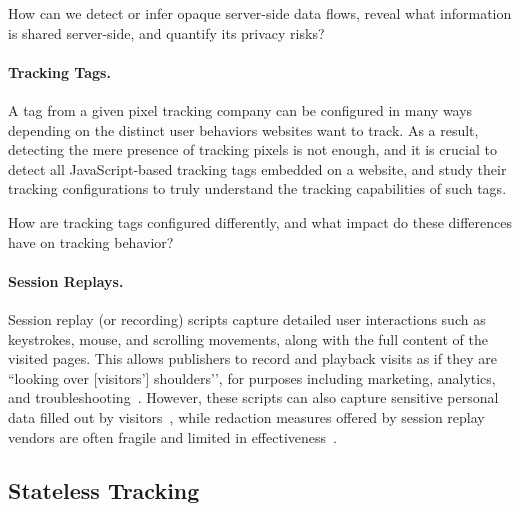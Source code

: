 \begin{opbox}
How can we detect or infer opaque server-side data flows, reveal what information is shared server-side, and quantify its privacy risks?
\end{opbox}
\vspace{-3mm}

\paragraph{Tracking Tags.}
A tag from a given pixel tracking company can be configured in many ways depending on the distinct user behaviors websites want to track. As a result, detecting the mere presence of tracking pixels is not enough, and it is crucial to detect all JavaScript-based tracking tags embedded on a website, and study their tracking configurations to truly understand the tracking capabilities of such tags.
\begin{opbox}
How are tracking tags configured differently, and what impact do these differences have on tracking behavior?
\end{opbox}
\vspace{-3mm}


\paragraph{Session Replays.}
Session replay (or recording) scripts capture detailed user interactions such as keystrokes, mouse, and scrolling movements, along with the full content of the visited pages.
%
This allows publishers to record and playback visits as if they are ``looking over [visitors’] shoulders’’, for purposes including marketing, analytics, and troubleshooting~\cite{AdvancedUsageInspectlet}.
%
However, these scripts can also capture sensitive personal data filled out by visitors~\cite{acarNoBoundariesData2020,senolLeakyFormsStudy2022,yuGotSickTracked2022}, while redaction measures offered by session replay vendors are often fragile and limited in effectiveness~\cite{englehardtNoBoundariesCredentials2018,acarNoBoundariesData2020}.

\vspace{-2mm}
\subsection{Stateless Tracking}
\vspace{-4mm}

